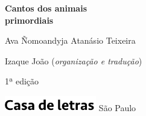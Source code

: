 




\begingroup\thispagestyle{empty}\vspace*{.05\textheight} 

              {\formular
              \huge
              \noindent
              \textbf{Cantos dos animais\\primordiais}\\
                
              \vspace{-0.5cm}
              
              }

              \vspace{1cm}
              
              {\formular\Large
              \noindent{}Ava Ñomoandyja Atanásio Teixeira
              }

              \vfill              

              {\small
              \noindent{}Izaque João (\textit{organização e tradução})
              }

              \vspace{0.5cm}

              {\small\noindent{}1ª edição}

              \vfill\noindent\includegraphics[width=0.3\textwidth]{LOGO_CDL.png}
              \break{} 
              \smallskip
              {\fontsize{30}{40}%
              \scriptsize\noindent São Paulo\quad\the\year}

\endgroup
\pagebreak
